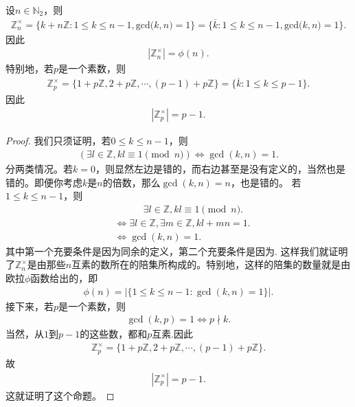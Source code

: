 \documentclass[../../main.tex]{subfiles}
\begin{document}
\begin{proposition}
设$n \in \mathbb{N}_2$，则
\begin{align*}
\mathbb{Z} _{n}^{\times}=\{k+n\mathbb{Z} :1\leqslant k\leqslant n-1,\mathrm{gcd(}k,n)=1\}=\{\overline{k}:1\leqslant k\leqslant n-1,\mathrm{gcd(}k,n)=1\}.
\end{align*}
因此 
\begin{align*}
|\mathbb{Z}_n^\times| = \phi(n) .
\end{align*}
特别地，若$p$是一个素数，则
\begin{align*}
\mathbb{Z}_p^\times = \{1 + p\mathbb{Z}, 2 + p\mathbb{Z}, \cdots, (p - 1) + p\mathbb{Z}\}=\{\overline{k}:1\leqslant k\leqslant p-1\}.
\end{align*}
因此
\begin{align*}
|\mathbb{Z}_p^\times| = p - 1 .
\end{align*}
\end{proposition}
\begin{proof}
我们只须证明，若$0 \leqslant k \leqslant n - 1$，则
\begin{align*}
(\exists l \in \mathbb{Z}, kl \equiv 1 \pmod{n}) \iff \gcd(k, n) = 1 .
\end{align*}
分两类情况。若$k = 0$，则显然左边是错的，而右边甚至是没有定义的，当然也是错的。即便你考虑$k$是$n$的倍数，那么$\gcd(k, n) = n$，也是错的。
若$1 \leqslant k \leqslant n - 1$，则
\begin{align*}
&\quad \quad \quad \exists l \in \mathbb{Z}, kl \equiv 1 \pmod{n} .
\\
&\iff \exists l \in \mathbb{Z}, \exists m \in \mathbb{Z}, kl + mn = 1 .
\\
&\iff \gcd(k, n) = 1 .
\end{align*}
其中第一个充要条件是因为同余的定义，第二个充要条件是因为.
这样我们就证明了$\mathbb{Z}_n^\times$是由那些$n$互素的数所在的陪集所构成的。特别地，这样的陪集的数量就是由欧拉$\phi$函数给出的，即
\begin{align*}
\phi(n) = |\{1 \leqslant k \leqslant n - 1 : \gcd(k, n) = 1\}| .
\end{align*}
接下来，若$p$是一个素数，则
\begin{align*}
\gcd(k, p) = 1 \iff p \nmid k.
\end{align*}
当然，从$1$到$p - 1$的这些数，都和$p$互素.因此
\begin{align*}
\mathbb{Z}_p^\times = \{1 + p\mathbb{Z}, 2 + p\mathbb{Z}, \cdots, (p - 1) + p\mathbb{Z}\} .
\end{align*}
故
\begin{align*}
|\mathbb{Z}_p^\times| = p - 1 .
\end{align*}
这就证明了这个命题。

\end{proof}
\end{document}
